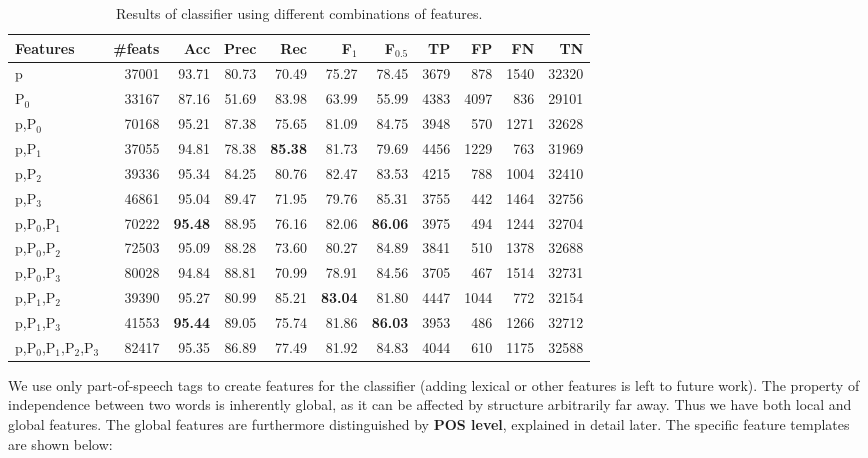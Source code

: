 \documentclass[11pt]{article}
\begin{document}
\begin{table*}[tbp]

\begin{tabular}{lrrrrrrrrrr}
Features & \#feats & Acc & Prec & Rec & F$_{\text{1}}$ & F$_{\text{0.5}}$ & TP & FP & FN & TN\\
\hline
p & 37001 & 93.71 & 80.73 & 70.49 & 75.27 & 78.45 & 3679 & 878 & 1540 & 32320\\
P$_{\text{0}}$ & 33167 & 87.16 & 51.69 & 83.98 & 63.99 & 55.99 & 4383 & 4097 & 836 & 29101\\
\hline
p,P$_{\text{0}}$ & 70168 & 95.21 & 87.38 & 75.65 & 81.09 & 84.75 & 3948 & 570 & 1271 & 32628\\
p,P$_{\text{1}}$ & 37055 & 94.81 & 78.38 & \textbf{85.38} & 81.73 & 79.69 & 4456 & 1229 & 763 & 31969\\
p,P$_{\text{2}}$ & 39336 & 95.34 & 84.25 & 80.76 & 82.47 & 83.53 & 4215 & 788 & 1004 & 32410\\
p,P$_{\text{3}}$ & 46861 & 95.04 & 89.47 & 71.95 & 79.76 & 85.31 & 3755 & 442 & 1464 & 32756\\
\hline
p,P$_{\text{0}}$,P$_{\text{1}}$ & 70222 & \textbf{95.48} & 88.95 & 76.16 & 82.06 & \textbf{86.06} & 3975 & 494 & 1244 & 32704\\
p,P$_{\text{0}}$,P$_{\text{2}}$ & 72503 & 95.09 & 88.28 & 73.60 & 80.27 & 84.89 & 3841 & 510 & 1378 & 32688\\
p,P$_{\text{0}}$,P$_{\text{3}}$ & 80028 & 94.84 & 88.81 & 70.99 & 78.91 & 84.56 & 3705 & 467 & 1514 & 32731\\
\hline
p,P$_{\text{1}}$,P$_{\text{2}}$ & 39390 & 95.27 & 80.99 & 85.21 & \textbf{83.04} & 81.80 & 4447 & 1044 & 772 & 32154\\
p,P$_{\text{1}}$,P$_{\text{3}}$ & 41553 & \textbf{95.44} & 89.05 & 75.74 & 81.86 & \textbf{86.03} & 3953 & 486 & 1266 & 32712\\
\hline
p,P$_{\text{0}}$,P$_{\text{1}}$,P$_{\text{2}}$,P$_{\text{3}}$ & 82417 & 95.35 & 86.89 & 77.49 & 81.92 & 84.83 & 4044 & 610 & 1175 & 32588\\
\end{tabular}

\caption{Results of classifier using different combinations of features.}
\label{tbl:feature-evaluation}
\end{table*}

We use only part-of-speech tags to create features for the classifier
(adding lexical or other features is left to future work). The
property of independence between two words is inherently global, as it
can be affected by structure arbitrarily far away. Thus we have both
local and global features. The global features are furthermore
distinguished by \textbf{POS level}, explained in detail later. The specific
feature templates are shown below:
\end{document}
